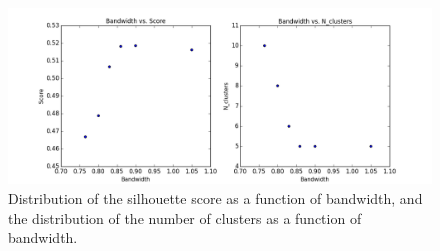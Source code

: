 \begin{figure}[H]
\centering
\includegraphics[width=\linewidth]{figs/methods/meanshift_parameters}
\caption{Distribution of the silhouette score as a function of bandwidth, and the distribution of the number of clusters as a function of bandwidth.}
\label{fig:bwscore}
\end{figure}